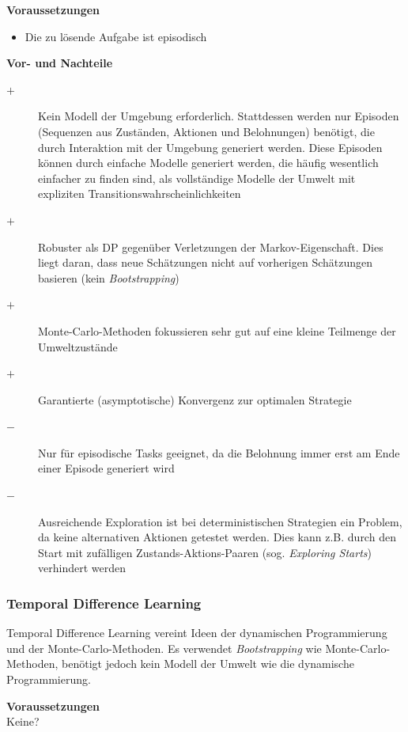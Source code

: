 \documentclass[10pt]{scrartcl}
\begin{document}
\textbf{Voraussetzungen}
\begin{itemize}
\item Die zu lösende Aufgabe ist episodisch
\end{itemize}

\vspace{1em}
\textbf{Vor- und Nachteile}
\begin{description}
\item[$+$] Kein Modell der Umgebung erforderlich. Stattdessen werden nur Episoden (Sequenzen aus Zuständen, Aktionen und Belohnungen) benötigt, die durch Interaktion mit der Umgebung generiert werden. Diese Episoden können durch einfache Modelle generiert werden, die häufig wesentlich einfacher zu finden sind, als vollständige Modelle der Umwelt mit expliziten Transitionswahrscheinlichkeiten
\item[$+$] Robuster als DP gegenüber Verletzungen der Markov-Eigenschaft. Dies liegt daran, dass neue Schätzungen nicht auf vorherigen Schätzungen basieren (kein \emph{Bootstrapping})
\item[$+$] Monte-Carlo-Methoden fokussieren sehr gut auf eine kleine Teilmenge der Umweltzustände
\item[$+$] Garantierte (asymptotische) Konvergenz zur optimalen Strategie
\item[$-$] Nur für episodische Tasks geeignet, da die Belohnung immer erst am Ende einer Episode generiert wird
\item[$-$] Ausreichende Exploration ist bei deterministischen Strategien ein Problem, da keine alternativen Aktionen getestet werden. Dies kann z.B. durch den Start mit zufälligen Zustands-Aktions-Paaren (sog. \emph{Exploring Starts}) verhindert werden
\end{description}

\subsubsection{Temporal Difference Learning}
Temporal Difference Learning vereint Ideen der dynamischen Programmierung und der Monte-Carlo-Methoden. Es verwendet \emph{Bootstrapping} wie Monte-Carlo-Methoden, benötigt jedoch kein Modell der Umwelt wie die dynamische Programmierung.

\textbf{Voraussetzungen} \\
Keine? 
\end{document}
